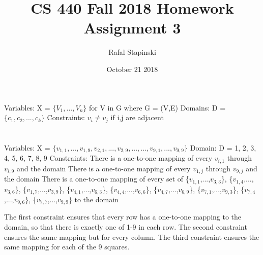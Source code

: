 \documentclass[a4paper]{article}
\title{CS 440 Fall 2018 Homework Assignment 3}
\author{Rafal Stapinski }
\date{October 21 2018}
\begin{document}
\maketitle

\section{}

Variables: X = ${\{V_1,...,V_n\}}$ for V in G where G = (V,E)\newline
Domains: D = ${\{c_1, c_2,...,c_k\}}$ \newline
Constraints: ${v_i \neq v_j}$ if i,j are adjacent

\section{}

Variables: X = ${\{v_{1,1},...,v_{1,9},v_{2,1},...,v_{2,9},...,...,v_{9,1},...,v_{9,9}\}}$ \newline
Domain: D = {1, 2, 3, 4, 5, 6, 7, 8, 9} \newline
Constraints: \newline
There is a one-to-one mapping of every $v_{i,1}$ through $v_{i,9}$ and the domain\newline
There is a one-to-one mapping of every $v_{1,j}$ through $v_{9,j}$ and the domain \newline
There is a one-to-one mapping of every set of {\{$v_{1,1}$,...,$v_{3,3}$\}, \{$v_{1,4}$,...,$v_{3,6}$\}, \{$v_{1,7}$,...,$v_{3,9}$\}, \{$v_{4,1}$,...,$v_{6,3}$\}, \{$v_{4,4}$,...,$v_{6,6}$\}, \{$v_{4,7}$,...,$v_{6,9}$\}, \{$v_{7,1}$,...,$v_{9,3}$\}, \{$v_{7,4}$,...,$v_{9,6}$\}, \{$v_{7,7}$,...,$v_{9,9}$\}} to the domain \newline \newline

The first constraint ensures that every row has a one-to-one mapping to the domain, so that there is exactly one of 1-9 in each row. The second constraint ensures the same mapping but for every column. The third constraint ensures the same mapping for each of the 9 squares. 

\section{}
\subsection{}
\end{document}
